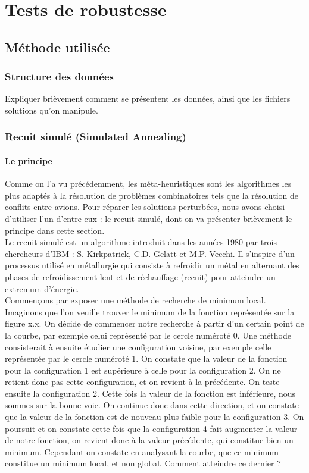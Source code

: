 \documentclass[11pt]{report}
\begin{document}
\chapter{Tests de robustesse}
\section{Méthode utilisée}
\subsection{Structure des données}
Expliquer brièvement comment se présentent les données, ainsi que les fichiers solutions qu'on manipule.
\subsection{Recuit simulé (Simulated Annealing)}
\subsubsection*{Le principe}
Comme on l'a vu précédemment, les méta-heuristiques sont les algorithmes les plus adaptés à la résolution de problèmes combinatoires tels que la résolution de conflits entre avions. Pour réparer les solutions perturbées, nous avons choisi d'utiliser l'un d'entre eux : le recuit simulé, dont on va présenter brièvement le principe dans cette section.\\

Le recuit simulé est un algorithme introduit dans les années 1980 par trois chercheurs d'IBM : S. Kirkpatrick, C.D. Gelatt et M.P. Vecchi. Il s'inspire d'un processus utilisé en métallurgie qui consiste à refroidir un métal en alternant des phases de refroidissement lent et de réchauffage (recuit) pour atteindre un extremum d'énergie. \\ 

Commençons par exposer une méthode de recherche de minimum local. Imaginons que l'on veuille trouver le minimum de la fonction représentée sur la figure x.x. On décide de commencer notre recherche à partir d'un certain point de la courbe, par exemple celui représenté par le cercle numéroté 0. Une méthode consisterait à ensuite étudier une configuration voisine, par exemple celle représentée par le cercle numéroté 1. On constate que la valeur de la fonction pour la configuration 1 est supérieure à celle pour la configuration 2. On ne retient donc pas cette configuration, et on revient à la précédente. On teste ensuite la configuration 2. Cette fois la valeur de la fonction est inférieure, nous sommes sur la bonne voie. On continue donc dans cette direction, et on constate que la valeur de la fonction est de nouveau plus faible pour la configuration 3. On poursuit et on constate cette fois que la configuration 4 fait augmenter la valeur de notre fonction, on revient donc à la valeur précédente, qui constitue bien un minimum. Cependant on constate en analysant la courbe, que ce minimum constitue un minimum local, et non global. Comment atteindre ce dernier ?\\
\end{document}
